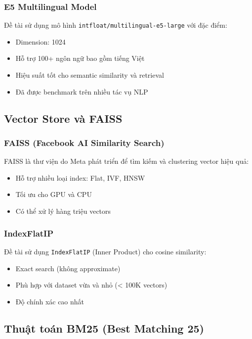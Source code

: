 \documentclass[../DoAn.tex]{subfiles}
\begin{document}
\subsubsection{E5 Multilingual Model}
Đề tài sử dụng mô hình \texttt{intfloat/multilingual-e5-large} với đặc điểm:
\begin{itemize}
    \item Dimension: 1024
    \item Hỗ trợ 100+ ngôn ngữ bao gồm tiếng Việt
    \item Hiệu suất tốt cho semantic similarity và retrieval
    \item Đã được benchmark trên nhiều tác vụ NLP
\end{itemize}

\subsection{Vector Store và FAISS}

\subsubsection{FAISS (Facebook AI Similarity Search)}
FAISS là thư viện do Meta phát triển để tìm kiếm và clustering vector hiệu quả:
\begin{itemize}
    \item Hỗ trợ nhiều loại index: Flat, IVF, HNSW
    \item Tối ưu cho GPU và CPU
    \item Có thể xử lý hàng triệu vectors
\end{itemize}

\subsubsection{IndexFlatIP}
Đề tài sử dụng \texttt{IndexFlatIP} (Inner Product) cho cosine similarity:
\begin{itemize}
    \item Exact search (không approximate)
    \item Phù hợp với dataset vừa và nhỏ (< 100K vectors)
    \item Độ chính xác cao nhất
\end{itemize}

\subsection{Thuật toán BM25 (Best Matching 25)}
\end{document}
